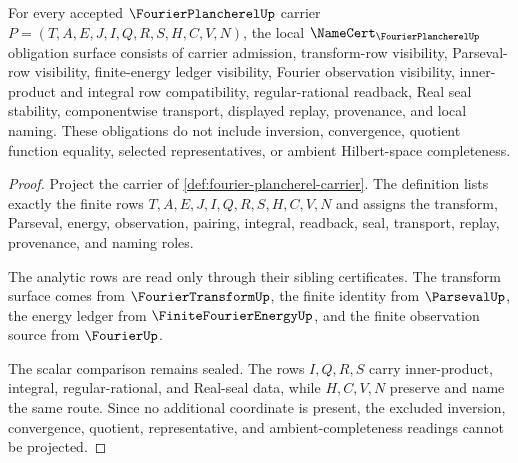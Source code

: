 \begin{theorem}
\label{thm:fourier-plancherel-namecert-obligations}
For every accepted $\FourierPlancherelUp$ carrier $P=(T,A,E,J,I,Q,R,S,H,C,V,N)$, the local $\NameCert_{\FourierPlancherelUp}$ obligation surface consists of carrier admission, transform-row visibility, Parseval-row visibility, finite-energy ledger visibility, Fourier observation visibility, inner-product and integral row compatibility, regular-rational readback, Real seal stability, componentwise transport, displayed replay, provenance, and local naming. These obligations do not include inversion, convergence, quotient function equality, selected representatives, or ambient Hilbert-space completeness.
\end{theorem}
\begin{proof}
Project the carrier of \autoref{def:fourier-plancherel-carrier}. The definition lists exactly the finite rows $T,A,E,J,I,Q,R,S,H,C,V,N$ and assigns the transform, Parseval, energy, observation, pairing, integral, readback, seal, transport, replay, provenance, and naming roles.

The analytic rows are read only through their sibling certificates. The transform surface comes from $\FourierTransformUp$, the finite identity from $\ParsevalUp$, the energy ledger from $\FiniteFourierEnergyUp$, and the finite observation source from $\FourierUp$.

The scalar comparison remains sealed. The rows $I,Q,R,S$ carry inner-product, integral, regular-rational, and Real-seal data, while $H,C,V,N$ preserve and name the same route. Since no additional coordinate is present, the excluded inversion, convergence, quotient, representative, and ambient-completeness readings cannot be projected.
\end{proof}

